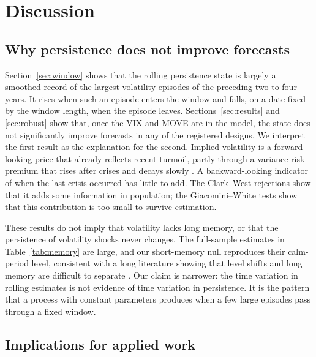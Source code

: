 \section{Discussion}\label{sec:discussion}

\subsection{Why persistence does not improve forecasts}

Section~\ref{sec:window} shows that the rolling persistence state is largely
a smoothed record of the largest volatility episodes of the preceding two to
four years. It rises when such an episode enters the window and falls, on a
date fixed by the window length, when the episode leaves.
Sections~\ref{sec:results} and \ref{sec:robust} show that, once the VIX and
MOVE are in the model, the state does not significantly improve forecasts in
any of the registered designs. We interpret the first result as the
explanation for the second. Implied volatility is a forward-looking price
that already reflects recent turmoil, partly through a variance risk premium
that rises after crises and decays slowly \citep{bates2000post,
bekaert2014vix, andersen2015risk}. A backward-looking indicator of when the
last crisis occurred has little to add. The Clark--West rejections show that
it adds some information in population; the Giacomini--White tests show that
this contribution is too small to survive estimation.

These results do not imply that volatility lacks long memory, or that the
persistence of volatility shocks never changes. The full-sample estimates in
Table~\ref{tab:memory} are large, and our short-memory null reproduces their
calm-period level, consistent with a long literature showing that level
shifts and long memory are difficult to separate \citep{diebold2001long,
perron2010long, varneskov2018combining}. Our claim is narrower: the time
variation in rolling estimates is not evidence of time variation in
persistence. It is the pattern that a process with constant parameters
produces when a few large episodes pass through a fixed window.

\subsection{Implications for applied work}

